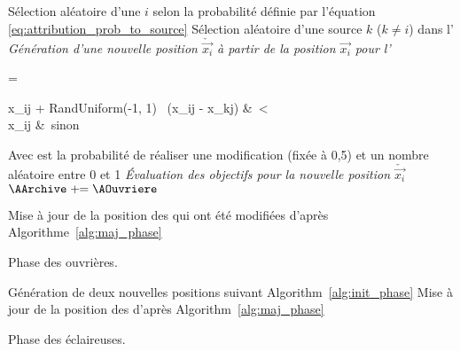\begin{algorithm}\label{alg:onlooker_phase}
  \SetAlgoVlined
  \DontPrintSemicolon
  \For{$\AOuvriere \in \AOnlookers$}
    {
      Sélection aléatoire d’une \ASource $i$ selon la probabilité
      définie par l’équation \eqref{eq:attribution_prob_to_source}\;
      Sélection aléatoire d’une source $k$ ($k \neq i$) dans l’\AArchive\;
       \emph{Génération d’une nouvelle position $\check{\vec{x_{i}}}$ à partir de la
                         position $\vec{x_{i}}$ pour l’\AOuvriere }\;
      {
      \begin{algomathdisplay}
         =%
          \begin{cases}
            x_{ij}  + RandUniform(-1, 1)   \times \ (x_{ij} - x_{kj}) &\ \ATirageB < \AMR \\
            x_{ij}                                                    &\ sinon
          \end{cases}
      \end{algomathdisplay}
      }
      \BlankLine
      Avec \AMR est la probabilité de réaliser une modification (fixée à 0,5) et
      \ATirageB un nombre aléatoire entre 0 et 1\;
      \BlankLine
       \emph{Évaluation des objectifs pour la nouvelle position $\check{\vec{x_{i}}}$}\;
      \BlankLine
      {
        $\AArchive \pluseq \AOuvriere$\;
      }
    }

  Mise à jour de la position des \ASources qui ont été modifiées d’après Algorithme~\ref{alg:maj_phase}\;
  \caption{Phase des ouvrières.}
\end{algorithm}

\begin{algorithm}\label{alg:scout_phase}
  \SetAlgoVlined
  {
    {
      Génération de deux nouvelles positions suivant Algorithm~\ref{alg:init_phase}\;
    }
  }
  Mise à jour de la position des \ASources d’après Algorithm~\ref{alg:maj_phase}\;
  \caption{Phase des éclaireuses.}
\end{algorithm}


